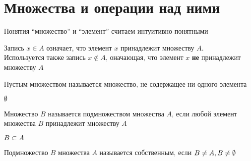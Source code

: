 \section{Множества и операции над ними}

Понятия ``множество'' и ``элемент'' считаем интуитивно понятными

\begin{notation}
	Запись $x \in A$ означает, что элемент $x$ принадлежит множеству $A$. \\
	Используется также запись $x \notin A$, оначающая, что элемент $x$ \textbf{не} принадлежит множеству $A$
\end{notation}


\begin{definition}
	Пустым множеством называется множество, не содержащее ни одного элемента
	\begin{notation}
		$\emptyset$
	\end{notation}

\end{definition}

\begin{definition}
	Множество $B$ называется подмножеством множества $A$, если любой элемент множества $B$ принадлежит множеству $A$
	\begin{notation}
		$B \subset A$
	\end{notation}

	Подмножество $B$ множества $A$ называется собственным, если $B \ne A, B \ne \emptyset$
\end{definition}


